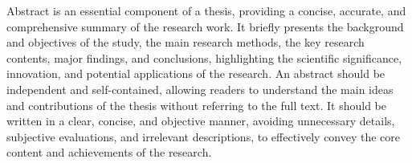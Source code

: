 
\begin{abstract}

2006年5月我校对已经实施的“陕西科技大学本科毕业生毕业论文（设计说明书）的书写及装订格式”进行修订。修订后的《陕西科技大学本科毕业生毕业论文（设计说明书）的书写及装订格式》使本科毕业生撰写毕业论文（设计说明书）时，在论文（设计说明书）的结构、装订、摘要、图表和参考文献等各方面有统一的标准，供学生和指导教师参考使用。

为了更好的说明格式要求，这里做了一个陕西科技大学本科毕业论文（设计说明书）的模版，请参照使用。

\zhlipsum[1-6][name=aspirin]

\end{abstract}



\begin{abstract*}

Abstract is an essential component of a thesis, providing a concise, accurate, and comprehensive summary of the research work. It briefly presents the background and objectives of the study, the main research methods, the key research contents, major findings, and conclusions, highlighting the scientific significance, innovation, and potential applications of the research. An abstract should be independent and self-contained, allowing readers to understand the main ideas and contributions of the thesis without referring to the full text. It should be written in a clear, concise, and objective manner, avoiding unnecessary details, subjective evaluations, and irrelevant descriptions, to effectively convey the core content and achievements of the research.

\end{abstract*}

